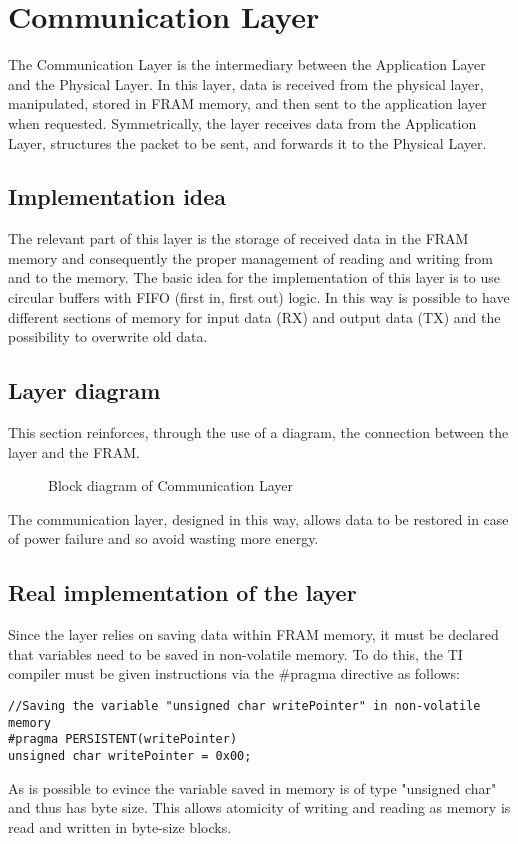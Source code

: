 \chapter{Communication Layer}
\label{cha:Communication Layer}
The Communication Layer is the intermediary between the Application Layer and the Physical Layer. In this layer, data is received from the physical layer, manipulated, stored in FRAM memory, and then sent to the application layer when requested. Symmetrically, the layer receives data from the Application Layer, structures the packet to be sent, and forwards it to the Physical Layer.

\section{Implementation idea}
\label{sec:Implementation idea Comm}
The relevant part of this layer is the storage of received data in the FRAM memory and consequently the proper management of reading and writing from and to the memory.
The basic idea for the implementation of this layer is to use circular buffers with FIFO (first in, first out) logic. In this way is possible to have different sections of memory for input data (RX) and output data (TX) and the possibility to overwrite old data.


\section{Layer diagram}
\label{sec:Layer diagram Comm}
This section reinforces, through the use of a diagram, the connection between the layer and the FRAM. 
  \begin{figure}[H]
    \centerline{}
    \caption{\footnotesize \centering Block diagram of Communication Layer}
    \label{fig:CommunicationLayerDiagram}
  \end{figure}
The communication layer, designed in this way, allows data to be restored in case of power failure and so avoid wasting more energy.


\section{Real implementation of the layer}
\label{sec:Real implementation of the layer Comm}
Since the layer relies on saving data within FRAM memory, it must be declared that variables need to be saved in non-volatile memory. To do this, the TI compiler must be given instructions via the \#pragma directive as follows:
\begin{lstlisting}
//Saving the variable "unsigned char writePointer" in non-volatile memory
#pragma PERSISTENT(writePointer)
unsigned char writePointer = 0x00;
\end{lstlisting}
As is possible to evince the variable saved in memory is of type "unsigned char" and thus has byte size. This allows atomicity of writing and reading as memory is read and written in byte-size blocks.\\
